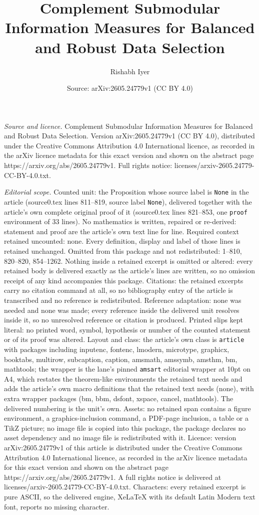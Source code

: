 \documentclass[10pt,a4paper]{amsart}
\title[Complement Submodular Information Measures for Balanced and ]{Complement Submodular Information Measures for Balanced and Robust Data Selection}
\author{Rishabh Iyer}
\date{Source: arXiv:2605.24779v1 (CC BY 4.0)}
\begin{document}
\maketitle

\noindent\emph{Source and licence.} Complement Submodular Information Measures for Balanced and Robust Data Selection. Version arXiv:2605.24779v1 (CC BY 4.0), distributed under the Creative Commons Attribution 4.0 International licence, as recorded in the arXiv licence metadata for this exact version and shown on the abstract page https://arxiv.org/abs/2605.24779v1. Full rights notice: licenses/arxiv-2605.24779-CC-BY-4.0.txt.\par\smallskip

\noindent\textit{Editorial scope.} Counted unit: the Proposition whose source label is \texttt{None} in the article (source0.tex lines 811--819, source label \texttt{None}), delivered together with the article's own complete original proof of it (source0.tex lines 821--853, one \texttt{proof} environment of 33 lines). No mathematics is written, repaired or re-derived: statement and proof are the article's own text line for line. Required context retained uncounted: none. Every definition, display and label of those lines is retained unchanged. Omitted from this package and not redistributed: 1--810, 820--820, 854--1262. Nothing inside a retained excerpt is omitted or altered: every retained body is delivered exactly as the article's lines are written, so no omission receipt of any kind accompanies this package. Citations: the retained excerpts carry no citation command at all, so no bibliography entry of the article is transcribed and no reference is redistributed. Reference adaptation: none was needed and none was made; every reference inside the delivered unit resolves inside it, so no unresolved reference or citation is produced. Printed slips kept literal: no printed word, symbol, hypothesis or number of the counted statement or of its proof was altered. Layout and class: the article's own class is \texttt{article} with packages including inputenc, fontenc, lmodern, microtype, graphicx, booktabs, multirow, subcaption, caption, amsmath, amssymb, amsthm, bm, mathtools; the wrapper is the lane's pinned \texttt{amsart} editorial wrapper at 10pt on A4, which restates the theorem-like environments the retained text needs and adds the article's own macro definitions that the retained text needs (none), with extra wrapper packages (bm, bbm, dsfont, xspace, cancel, mathtools). The delivered numbering is the unit's own. Assets: no retained span contains a figure environment, a graphics-inclusion command, a PDF-page inclusion, a table or a TikZ picture; no image file is copied into this package, the package declares no asset dependency and no image file is redistributed with it. Licence: version arXiv:2605.24779v1 of this article is distributed under the Creative Commons Attribution 4.0 International licence, as recorded in the arXiv licence metadata for this exact version and shown on the abstract page https://arxiv.org/abs/2605.24779v1. A full rights notice is delivered at licenses/arxiv-2605.24779-CC-BY-4.0.txt. Characters: every retained excerpt is pure ASCII, so the delivered engine, XeLaTeX with its default Latin Modern text font, reports no missing character.
\end{document}

